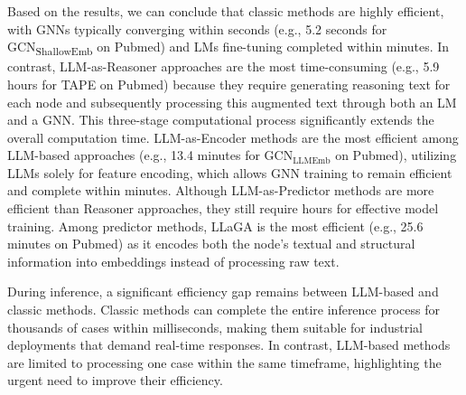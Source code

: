 Based on the results, we can conclude that classic methods are highly efficient, with GNNs typically converging within seconds (e.g., 5.2 seconds for GCN\textsubscript{ShallowEmb} on Pubmed) and LMs fine-tuning completed within minutes. In contrast, LLM-as-Reasoner approaches are the most time-consuming (e.g., 5.9 hours for TAPE on Pubmed) because they require generating reasoning text for each node and subsequently processing this augmented text through both an LM and a GNN. This three-stage computational process significantly extends the overall computation time. LLM-as-Encoder methods are the most efficient among LLM-based approaches (e.g., 13.4 minutes for GCN$_{\text{LLMEmb}}$ on Pubmed), utilizing LLMs solely for feature encoding, which allows GNN training to remain efficient and complete within minutes. Although LLM-as-Predictor methods are more efficient than Reasoner approaches, they still require hours for effective model training. Among predictor methods, LLaGA is the most efficient (e.g., 25.6 minutes on Pubmed) as it encodes both the node's textual and structural information into embeddings instead of processing raw text.

During inference, a significant efficiency gap remains between LLM-based and classic methods. Classic methods can complete the entire inference process for thousands of cases within milliseconds, making them suitable for industrial deployments that demand real-time responses. In contrast, LLM-based methods are limited to processing one case within the same timeframe, highlighting the urgent need to improve their efficiency.